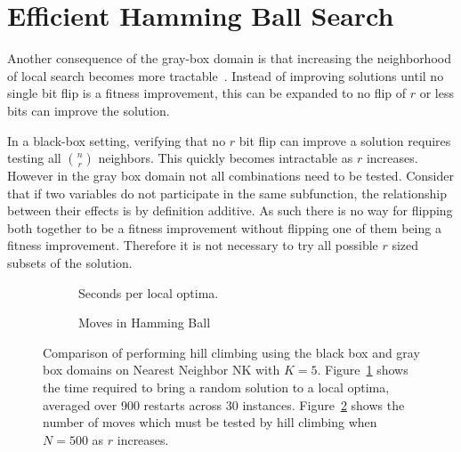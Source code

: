 \section{Efficient Hamming Ball Search}
Another consequence of the gray-box domain is that increasing the neighborhood of local search becomes
more tractable~\cite{chicano:2014:ball}.  Instead of improving solutions until no single bit flip
is a fitness improvement, this can be expanded to no flip of $r$ or less bits can improve the solution.

In a black-box setting, verifying that no $r$ bit flip can improve a solution requires testing all
$n \choose r$ neighbors. This quickly becomes intractable as $r$ increases. However in the gray
box domain not all combinations need to be tested. Consider that if two variables do not participate
in the same subfunction, the relationship between their effects is by definition additive. As such
there is no way for flipping both together to be a fitness improvement without flipping one of them
being a fitness improvement. Therefore it is not necessary to try all possible $r$ sized subsets
of the solution.

\begin{figure}[t]
  \begin{centering}
    \begin{subfigure}{.5\textwidth}
      \begin{centering}
      \end{centering}
      \caption{Seconds per local optima.}
      \label{fig-hc-time}
    \end{subfigure}%
    \begin{subfigure}{.5\textwidth}
      \begin{centering}
      \end{centering}
      \caption{Moves in Hamming Ball}
      \label{fig-hc-radius}
    \end{subfigure}
  \end{centering}
  \caption{Comparison of performing hill climbing
           using the black box and gray box domains on Nearest Neighbor NK with $K=5$.
           Figure~\ref{fig-hc-time} shows the time required to bring a random
           solution to a local optima, averaged over 900 restarts across 30 instances.
           Figure~\ref{fig-hc-radius} shows the number of moves which must be
           tested by hill climbing when $N=500$ as $r$ increases.}
  \label{fig-hc-compare}
\end{figure}

